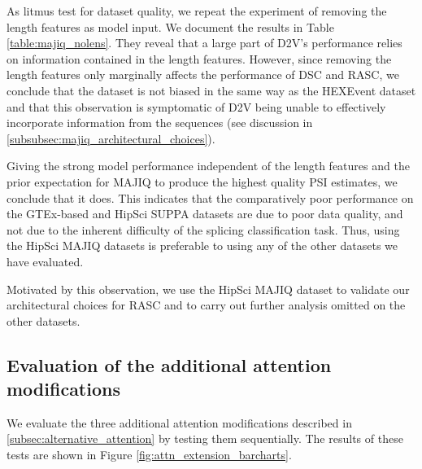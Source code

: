 As litmus test for dataset quality, we repeat the experiment of removing the length features as model input. We document the results in Table \ref{table:majiq_nolens}.
They reveal that a large part of D2V's performance relies on information contained in the length features. However, since removing the length features only marginally affects the performance of DSC and RASC, we conclude that the dataset is not biased in the same way as the HEXEvent dataset and that this observation is symptomatic of D2V being unable to effectively incorporate information from the sequences (see discussion in \ref{subsubsec:majiq_architectural_choices}). 

Giving the strong model performance independent of the length features and the prior expectation for MAJIQ to produce the highest quality PSI estimates, we conclude that it does. This indicates that the comparatively poor performance on the GTEx-based and HipSci SUPPA datasets are due to poor data quality, and not due to the inherent difficulty of the splicing classification task. Thus, using the HipSci MAJIQ datasets is preferable to using any of the other datasets we have evaluated. 

Motivated by this observation, we use the HipSci MAJIQ dataset to validate our architectural choices for RASC and to carry out further analysis omitted on the other datasets.





\subsection{Evaluation of the additional attention modifications} \label{subsubsec:attn_hyperparams}

We evaluate the three additional attention modifications described in \ref{subsec:alternative_attention} by testing them sequentially. The results of these tests are shown in Figure \ref{fig:attn_extension_barcharts}. 

